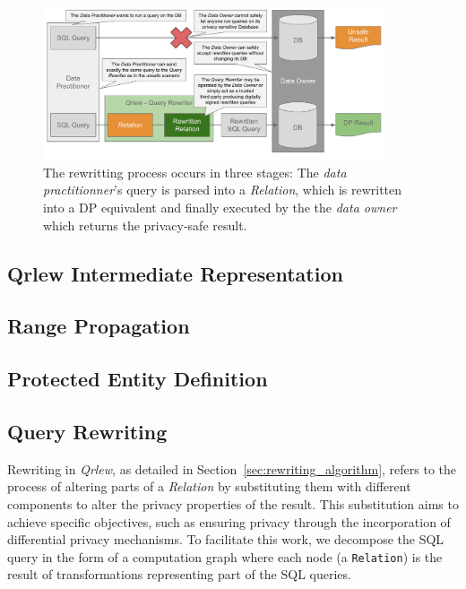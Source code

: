 \documentclass[letterpaper]{article} %
\newcommand{\qrlew}{\emph{Qrlew}}
\begin{document}
\begin{figure}[t]
    \centering
    \includegraphics[width=0.9\textwidth]{figures/Qrlew - process.pdf} %
    \caption{The rewritting process occurs in three stages: The \emph{data practitionner}'s query is parsed into a \emph{Relation}, which is rewritten into a DP equivalent and finally executed by the the \emph{data owner} which returns the privacy-safe result.}
    \label{process}
    \end{figure}

\subsection{Qrlew Intermediate Representation}



\subsection{Range Propagation}

\subsection{Protected Entity Definition}

\subsection{Query Rewriting}

Rewriting in \qrlew{}, as detailed in Section~\ref{sec:rewriting_algorithm}, refers to the process of altering parts of a \emph{Relation} by substituting them with different components to alter the privacy properties of the result. This substitution aims to achieve specific objectives, such as ensuring privacy through the incorporation of differential privacy mechanisms. To facilitate this work, we decompose the SQL query in the form of a computation graph where each node (a \texttt{Relation}) is the result of transformations representing part of the SQL queries.
\end{document}
